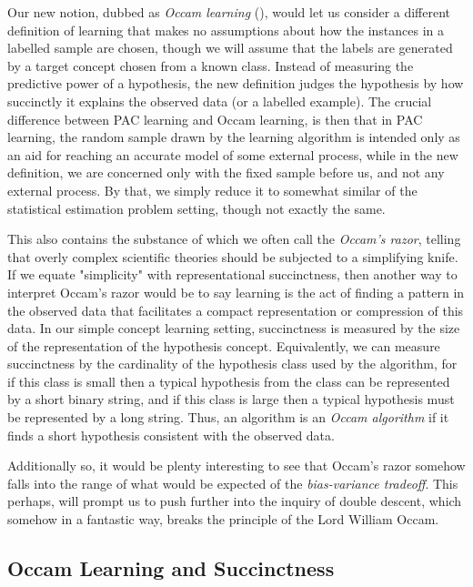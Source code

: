 Our new notion, dubbed as \textit{Occam learning} (\cite{10.5555/200548}), would let us consider a different definition of learning that makes no assumptions about how the instances in a labelled sample are chosen, though we will assume that the labels are generated by a target concept chosen from a known class. Instead of measuring the predictive power of a hypothesis, the new definition judges the hypothesis by how succinctly it explains the observed data (or a labelled example). The crucial difference between PAC learning and Occam learning, is then that in PAC learning, the random sample drawn by the learning algorithm is intended only as an aid for reaching an accurate model of some external process, while in the new definition, we are concerned only with the fixed sample before us, and not any external process. By that, we simply reduce it to somewhat similar of the statistical estimation problem setting, though not exactly the same. 

This also contains the substance of which we often call the \textit{Occam's razor}, telling that overly complex scientific theories should be subjected to a simplifying knife. If we equate "simplicity" with representational succinctness, then another way to interpret Occam's razor would be to say learning is the act of finding a pattern in the observed data that facilitates a compact representation or compression of this data. In our simple concept learning setting, succinctness is measured by the size of the representation of the hypothesis concept. Equivalently, we can measure succinctness by the cardinality of the hypothesis class used by the algorithm, for if this class is small then a typical hypothesis from the class can be represented by a short binary string, and if this class is large then a typical hypothesis must be represented by a long string. Thus, an algorithm is an \textit{Occam algorithm} if it finds a short hypothesis consistent with the observed data. 

Additionally so, it would be plenty interesting to see that Occam's razor somehow falls into the range of what would be expected of the \textit{bias-variance tradeoff}. This perhaps, will prompt us to push further into the inquiry of double descent, which somehow in a fantastic way, breaks the principle of the Lord William Occam. 
\subsection{Occam Learning and Succinctness}

